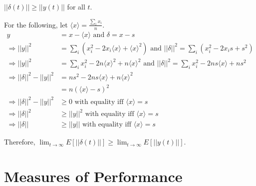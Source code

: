 \documentclass{article}
\begin{document}

\begin{claim}
$||\delta(t)||\geq||y(t)||$ for all $t$.
\end{claim}

\begin{pf}
For the following, let $\langle x\rangle =\frac{\sum_ix_i}{n}$.
\begin{align*}
y&=x-\langle x\rangle \text{ and } \delta=x-s
\\ \Rightarrow ||y||^2&=\sum_i(x_i^2-2x_i\langle x\rangle+\langle x\rangle^2) \text{ and } ||\delta||^2=\sum_i(x_i^2-2x_is+s^2)
\\ \Rightarrow ||y||^2&=\sum_ix_i^2-2n\langle x\rangle^2+n\langle x\rangle^2 \text{ and } ||\delta||^2=\sum_ix_i^2-2ns\langle x\rangle+ns^2
\\ \Rightarrow ||\delta||^2-||y||^2&=ns^2-2ns\langle x\rangle+n\langle x\rangle^2
\\ &=n(\langle x\rangle-s)^2
\\ \Rightarrow ||\delta||^2-||y||^2&\geq 0 \text{ with equality iff } \langle x\rangle=s
\\ \Rightarrow ||\delta||^2&\geq||y||^2 \text{ with equality iff } \langle x\rangle=s
\\ \Rightarrow ||\delta||&\geq ||y|| \text{ with equality iff } \langle x\rangle=s
\end{align*}

\end{pf}

Therefore, $\lim_{t\to\infty}E[||\delta(t)||]\geq\lim_{t\to\infty}E[||y(t)||]$.

\section{Measures of Performance }
\end{document}
